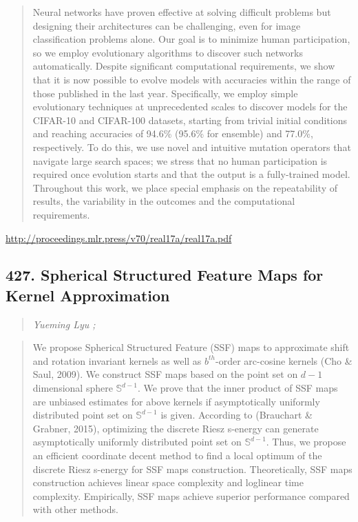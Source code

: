\documentclass{article}
\begin{document}
\begin{quote}
    Neural networks have proven effective at solving difficult problems but designing their architectures can be challenging, even for image classification problems alone. Our goal is to minimize human participation, so we employ evolutionary algorithms to discover such networks automatically. Despite significant computational requirements, we show that it is now possible to evolve models with accuracies within the range of those published in the last year. Specifically, we employ simple evolutionary techniques at unprecedented scales to discover models for the CIFAR-10 and CIFAR-100 datasets, starting from trivial initial conditions and reaching accuracies of 94.6\% (95.6\% for ensemble) and 77.0\%, respectively. To do this, we use novel and intuitive mutation operators that navigate large search spaces; we stress that no human participation is required once evolution starts and that the output is a fully-trained model. Throughout this work, we place special emphasis on the repeatability of results, the variability in the outcomes and the computational requirements.  
\end{quote}

\href{http://proceedings.mlr.press/v70/real17a/real17a.pdf}{http://proceedings.mlr.press/v70/real17a/real17a.pdf}

\subsection{427. Spherical Structured Feature Maps for Kernel Approximation}

\begin{quote}
\footnotesize{\textit{Yueming Lyu ;}}

\end{quote}

\begin{quote}
    We propose Spherical Structured Feature (SSF) maps to approximate shift and rotation invariant kernels as well as $b^{th}$-order arc-cosine kernels (Cho \& Saul, 2009). We construct SSF maps based on the point set on $d-1$ dimensional sphere $\mathbb{S}^{d-1}$. We prove that the inner product of SSF maps are unbiased estimates for above kernels if asymptotically uniformly distributed point set on $\mathbb{S}^{d-1}$ is given. According to (Brauchart \& Grabner, 2015), optimizing the discrete Riesz s-energy can generate asymptotically uniformly distributed point set on $\mathbb{S}^{d-1}$. Thus, we propose an efficient coordinate decent method to find a local optimum of the discrete Riesz s-energy for SSF maps construction. Theoretically, SSF maps construction achieves linear space complexity and loglinear time complexity. Empirically, SSF maps achieve superior performance compared with other methods.  
\end{quote}
\end{document}
